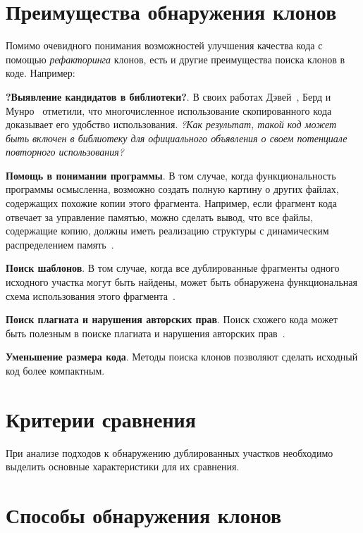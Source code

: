 \section{Преимущества обнаружения клонов}

Помимо очевидного понимания возможностей улучшения качества кода с помощью \textit{рефакторинга} клонов, есть и другие преимущества поиска клонов в коде. Например: 

\textbf{?Выявление кандидатов в библиотеки?}. В своих работах Дэвей~\cite{davey}, Берд и Мунро~\cite{burdmunro} отметили, что многочисленное использование скопированного кода доказывает его удобство использования. \textit{?Как результат, такой код может быть включен в библиотеку для официального объявления о своем потенциале повторного использования?}

\textbf{Помощь в понимании программы}. В том случае, когда функциональность программы осмысленна, возможно создать полную картину о других файлах, содержащих похожие копии этого фрагмента. Например, если фрагмент кода отвечает за управление памятью, можно сделать вывод, что все файлы, содержащие копию, должны иметь реализацию структуры с динамическим распределением память~\cite{memex}.

\textbf{Поиск шаблонов}. В том случае, когда все дублированные фрагменты одного исходного участка могут быть найдены, может быть обнаружена функциональная схема использования этого фрагмента~\cite{memex}.

\textbf{Поиск плагиата и нарушения авторских прав}. Поиск схожего кода может быть полезным в поиске плагиата и нарушения авторских прав~\cite{plagiat}.

\textbf{Уменьшение размера кода}. Методы поиска клонов позволяют сделать исходный код более компактным.

\section{Критерии сравнения}

При анализе подходов к обнаружению дублированных участков необходимо выделить основные характеристики для их сравнения. 

\section{Способы обнаружения клонов}

